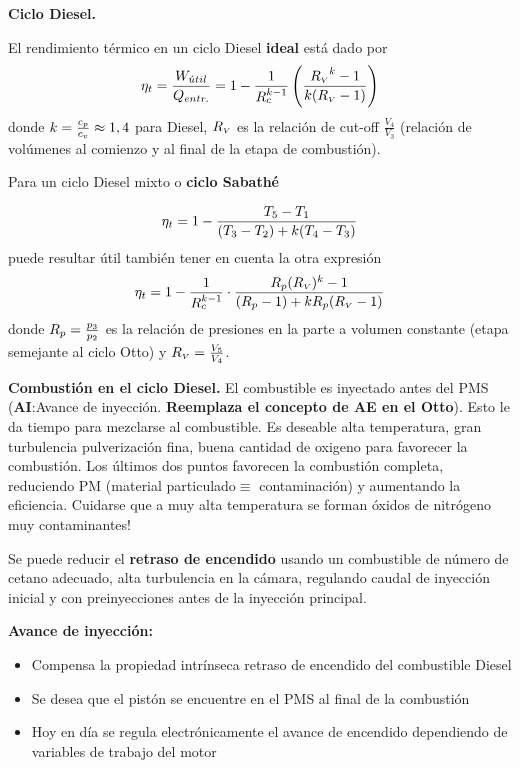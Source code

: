 {\bf Ciclo Diesel.} 

El rendimiento térmico en un ciclo Diesel \textbf{ideal} está dado por 
\[
\eta_t=\frac{W_{\acute{u}til}}{Q_{entr.}}=1-\frac{1}{R_c^{k-1}}\left( \frac{{R_{\mbox{\tiny $V$}}}^k-1}{k({R_{\mbox{\tiny $V$}}}-1)}\right)
\]
donde $k=\frac{c_p}{c_v}\approx1,4$ para Diesel, ${R_{\mbox{\tiny $V$}}}$ es la relación de cut-off $\frac{V_4}{V_3}$ (relación de volúmenes al comienzo y al final de la etapa de combustión).

Para un ciclo Diesel mixto o \textbf{ciclo Sabathé}

\[
\eta_t = 1- \frac{T_5-T_1}{(T_3-T_2)+k(T_4-T_3)}
\]
puede resultar útil también tener en cuenta la otra expresión
\[
\eta_t=1-\frac{1}{R_c^{k -1}}\cdot \frac{R_p({R_{\mbox{\tiny $V$}}})^k-1}{(R_p -1)+kR_p({R_{\mbox{\tiny $V$}}}-1)}\]
donde $R_p=\frac{p_3}{p_2}$ es la relación de presiones en la parte a volumen constante (etapa semejante al ciclo Otto) y ${R_{\mbox{\tiny $V$}}} = \frac{V_5}{V_4}$.

\textbf{Combustión en el ciclo Diesel.} El combustible es inyectado antes del PMS (\textbf{AI}:Avance de inyección. \textbf{Reemplaza el concepto de AE en el Otto}). Esto le da tiempo para mezclarse al combustible. Es deseable alta temperatura, gran turbulencia  pulverización fina, buena cantidad de oxigeno para favorecer la combustión. Los últimos dos puntos favorecen la combustión completa, reduciendo PM (material particulado$\equiv$ contaminación) y aumentando la eficiencia. Cuidarse que a muy alta temperatura se forman óxidos de nitrógeno muy contaminantes!

Se puede reducir el \textbf{retraso de encendido} usando un combustible de número de cetano adecuado, alta turbulencia en la cámara, regulando caudal de inyección inicial y con preinyecciones antes de la inyección principal.

\textbf{Avance de inyección:} 
\begin{itemize}
    \item Compensa la propiedad intrínseca retraso de encendido del combustible Diesel
    \item Se desea que el pistón se encuentre en el PMS al final de la combustión
    \item Hoy en día se regula electrónicamente el avance de encendido dependiendo de variables de trabajo del motor
\end{itemize}

